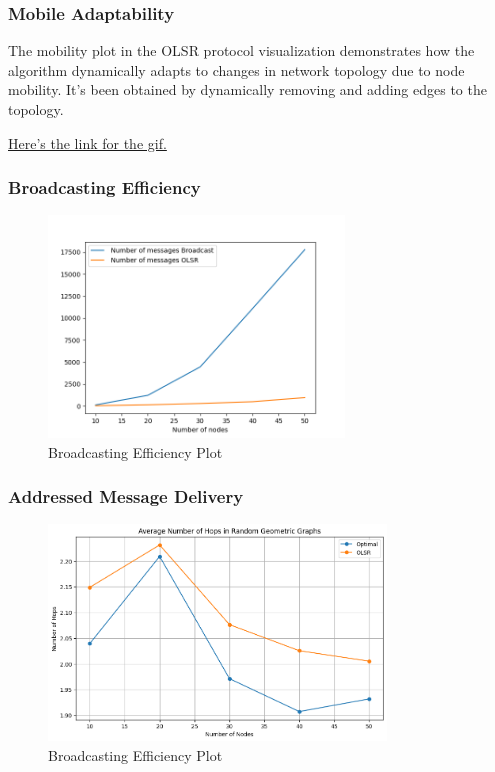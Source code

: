 \documentclass[11pt]{beamer}              %
\begin{document}
\begin{frame}
\frametitle{Mobile Adaptability}

The mobility plot in the OLSR protocol visualization demonstrates how the algorithm dynamically adapts to changes in network topology due to node mobility.  It's been obtained by dynamically removing and adding edges to the topology.

\href{https://s12.gifyu.com/images/SaIbC.gif}{Here's the link for the gif.}

\end{frame}

\begin{frame}
\frametitle{Broadcasting Efficiency}

    \begin{figure}
        \centering
        \includegraphics[width=0.7\textwidth]{figures/comparison.png}
        \caption{Broadcasting Efficiency Plot}
    \end{figure}    

\end{frame}

\begin{frame}
\frametitle{Addressed Message Delivery}

    \begin{figure}
        \centering
        \includegraphics[width=0.8\textwidth]{figures/hops.png}
        \caption{Broadcasting Efficiency Plot}
    \end{figure}    

\end{frame}
\end{document}
